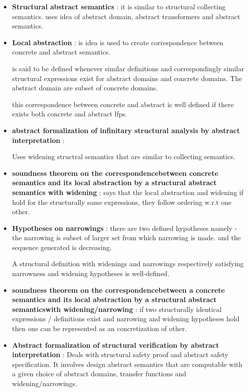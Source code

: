 \begin{itemize}
{	they are well defined if lfp exist for such cpos.
	}

	\item{\textbf{Structural abstract semantics} : it is similar to structural collecting semantics. uses idea of abstract domain, abstract transformers and abstract semantics. 
	}

	\item{\textbf{Local abstraction} : is idea is used to create correspondence between concrete and abstract semantics.

	is said to be defined whenever similar definitions and correspondingly similar structural expressions exist for abstract domains and concrete domains. The abstract domain are subset of concrete domains.

	this correspondence between concrete and abstract is well defined if there exists both concrete and abstract lfps.  
	}

	\item{\textbf{abstract formalization of infinitary structural analysis by abstract interpretation}  :

	Uses widening structral semantics that are similar to collecting semantics. 
	}


	\item{\textbf{soundness theorem on the correspondencebetween concrete semantics and its local abstraction by a structural abstract semantics with widening} : says that the local abstraction and widening if hold for the structurally same expressions, they follow ordering w.r.t one other. 
	}

	\item{\textbf{Hypotheses on narrowings} : there are two defined hypotheses namely - the narrowing is subset of larger set from which narrowing is made. and the sequence generated is decreasing.

	A structural definition with widenings and narrowings respectively satisfying narrowness and widening hypotheses is well-defined.
	}

	\item{\textbf{soundness theorem on the correspondencebetween a concrete semantics and its local abstraction by a structural abstract semanticswith widening/narrowing} : if two structurally identical expressions / definitions exist and narrowing and widening hypotheses hold then one can be represented as an concretization of other.
	}

	\item{\textbf{Abstract formalization of structural verification by abstract interpretation} :  
	Deals with structural safety proof and abstract safety specification. It involves design abstract semantics that are computable with a given choice of abstract domains, transfer functions and widening/narrowings. 
	}


\end{itemize}
